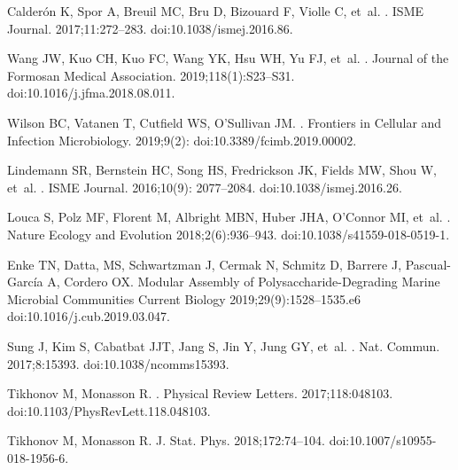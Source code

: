 \documentclass[10pt,letterpaper]{article}
\begin{document}
\begin{thebibliography}{10}
Calderón K, Spor A, Breuil MC, Bru D, Bizouard F, Violle C, et~al.
.
\newblock ISME Journal. 2017;11:272--283.
\newblock doi:{10.1038/ismej.2016.86}.

Wang JW, Kuo CH, Kuo FC, Wang YK, Hsu WH, Yu FJ, et~al.
.
\newblock Journal of the Formosan Medical Association. 2019;118(1):S23--S31.
\newblock doi:{10.1016/j.jfma.2018.08.011}.

Wilson BC, Vatanen T, Cutfield WS, O'Sullivan JM.
.
\newblock Frontiers in Cellular and Infection Microbiology. 2019;9(2):
\newblock doi:{10.3389/fcimb.2019.00002}.

Lindemann SR, Bernstein HC, Song HS, Fredrickson JK, Fields MW, Shou W, et~al.
.
\newblock ISME Journal. 2016;10(9): 2077--2084.
\newblock doi:{10.1038/ismej.2016.26}.

Louca S, Polz MF, Florent M, Albright MBN, Huber JHA, O'Connor MI, et~al.
.
\newblock Nature Ecology and Evolution 2018;2(6):936--943.
\newblock doi:{10.1038/s41559-018-0519-1}.

Enke TN, Datta, MS, Schwartzman J, Cermak N, Schmitz D, Barrere J, Pascual-García A, Cordero OX.
\newblock Modular Assembly of Polysaccharide-Degrading Marine Microbial Communities
\newblock Current Biology 2019;29(9):1528--1535.e6
\newblock doi:{10.1016/j.cub.2019.03.047}.

Sung J, Kim S, Cabatbat JJT, Jang S, Jin Y, Jung GY, et~al.
.
\newblock Nat. Commun. 2017;8:15393.
\newblock doi:{10.1038/ncomms15393}.

Tikhonov M, Monasson R.
.
\newblock Physical Review Letters. 2017;118:048103.
\newblock doi:{10.1103/PhysRevLett.118.048103}.

Tikhonov M, Monasson R.
\newblock J. Stat. Phys. 2018;172:74--104.
\newblock doi:{10.1007/s10955-018-1956-6}.


\end{thebibliography}
\end{document}
